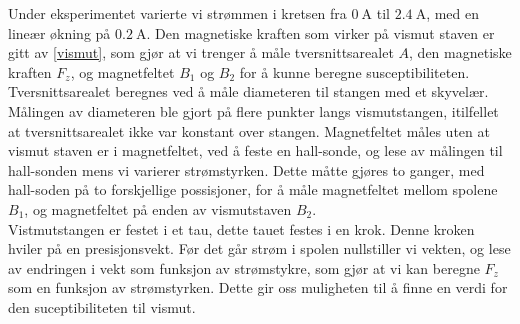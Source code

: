 \documentclass[%
 reprint,
 amsmath,amssymb,
 aps,
 norsk,
]{revtex4-1}
\begin{document}
Under eksperimentet varierte vi strømmen i kretsen fra $\SI{0}{\ampere}$ til $\SI{2.4}{\ampere}$, med en lineær økning på $\SI{0.2}{\ampere}$. Den magnetiske kraften som virker på vismut staven er gitt av \eqref{vismut}, som gjør at vi trenger å måle tversnittsarealet $A$, den magnetiske kraften $F_z$, og magnetfeltet $B_1$ og $B_2$ for å kunne beregne susceptibiliteten. Tversnittsarealet beregnes ved å måle diameteren til stangen med et skyvelær. Målingen av diameteren ble gjort på flere punkter langs vismutstangen, itilfellet at tversnittsarealet ikke var konstant over stangen. Magnetfeltet måles uten at vismut staven er i magnetfeltet, ved å feste en hall-sonde, og lese av målingen til hall-sonden mens vi varierer strømstyrken. Dette måtte gjøres to ganger, med hall-soden på to forskjellige possisjoner, for å måle magnetfeltet mellom spolene $B_1$, og magnetfeltet på enden av vismutstaven $B_2$. \\
Vistmutstangen er festet i et tau, dette tauet festes i en krok. Denne kroken hviler på en presisjonsvekt. Før det går strøm i spolen nullstiller vi vekten, og lese av endringen i vekt som funksjon av strømstykre, som gjør at vi kan beregne $F_z$ som en funksjon av strømstyrken. Dette gir oss muligheten til å finne en verdi for den suceptibiliteten til vismut.
\end{document}
